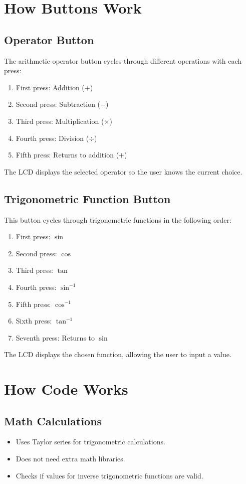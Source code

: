 \documentclass[journal]{IEEEtran}
\begin{document}
\section{How Buttons Work}
\subsection{Operator Button}
The arithmetic operator button cycles through different operations with each press:
\begin{enumerate}
    \item First press: Addition ($+$)
    \item Second press: Subtraction ($-$)
    \item Third press: Multiplication ($\times$)
    \item Fourth press: Division ($\div$)
    \item Fifth press: Returns to addition ($+$)
\end{enumerate}
The LCD displays the selected operator so the user knows the current choice.

\subsection{Trigonometric Function Button}
This button cycles through trigonometric functions in the following order:
\begin{enumerate}
    \item First press: $\sin$
    \item Second press: $\cos$
    \item Third press: $\tan$
    \item Fourth press: $\sin^{-1}$
    \item Fifth press: $\cos^{-1}$
    \item Sixth press: $\tan^{-1}$
    \item Seventh press: Returns to $\sin$
\end{enumerate}
The LCD displays the chosen function, allowing the user to input a value.

\section{How Code Works}
\subsection{Math Calculations}
\begin{itemize}
    \item Uses Taylor series for trigonometric calculations.
    \item Does not need extra math libraries.
    \item Checks if values for inverse trigonometric functions are valid.
\end{itemize}
\end{document}
